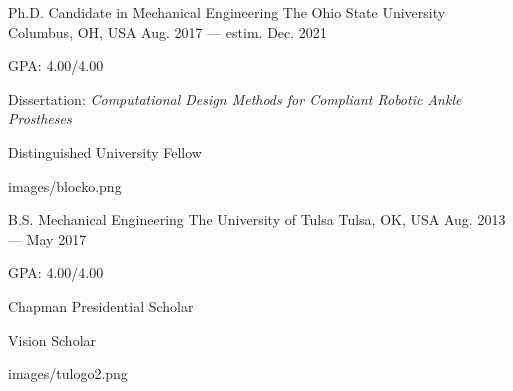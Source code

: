 

\begin{cventries}
	
	\cveducation
	{Ph.D. Candidate in Mechanical Engineering} %
	{The Ohio State University} %
	{Columbus, OH, USA} %
	{Aug. 2017 --- estim. Dec. 2021} %
	{
		\begin{cvitems} %
			\item {GPA: 4.00/4.00}
			\item {Dissertation: \textit{Computational Design Methods for Compliant Robotic Ankle Prostheses}}
			\item {Distinguished University Fellow}
		\end{cvitems}
	}
	{images/blocko.png}

	\cveducation
    {B.S. Mechanical Engineering} %
    {The University of Tulsa} %
    {Tulsa, OK, USA} %
    {Aug. 2013 --- May 2017} %
    {
      \begin{cvitems} %
      	\item {GPA: 4.00/4.00}
        \item {Chapman Presidential Scholar}
        \item {Vision Scholar}
      \end{cvitems}
    }
	{images/tulogo2.png}
\end{cventries}
